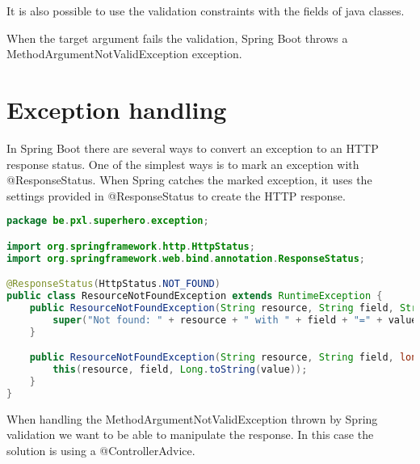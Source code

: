 It is also possible to use the validation constraints with the fields of java classes.

When the target argument fails the validation, Spring Boot throws a MethodArgumentNotValidException exception.

\section{Exception handling}

In Spring Boot there are several ways to convert an exception to an HTTP response status.
One of the simplest ways is to mark an exception with @ResponseStatus. 
When Spring catches the marked exception, it uses the settings provided in @ResponseStatus to create the HTTP response.

\begin{lstlisting}[language=java, frame=single]
package be.pxl.superhero.exception;

import org.springframework.http.HttpStatus;
import org.springframework.web.bind.annotation.ResponseStatus;

@ResponseStatus(HttpStatus.NOT_FOUND)
public class ResourceNotFoundException extends RuntimeException {
    public ResourceNotFoundException(String resource, String field, String value) {
        super("Not found: " + resource + " with " + field + "=" + value);
    }

    public ResourceNotFoundException(String resource, String field, long value) {
        this(resource, field, Long.toString(value));
    }
}
\end{lstlisting}

When handling the MethodArgumentNotValidException thrown by Spring validation we want to be able to manipulate the response.
In this case the solution is using a @ControllerAdvice.

